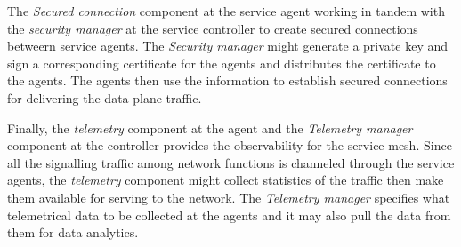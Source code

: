\documentclass[a4paper]{article}
\begin{document}
The \textit{Secured connection} component at the service agent working in tandem with the \textit{security manager} at the service controller to create secured connections betweern service agents. The \textit{Security manager} might generate a private key and sign a corresponding certificate for the agents and distributes the certificate to the agents. The agents then use the information to establish secured connections for delivering the data plane traffic.

Finally, the \textit{telemetry} component at the agent and the \textit{Telemetry manager} component at the controller provides the observability for the service mesh. Since all the signalling traffic among network functions is channeled through the service agents, the \textit{telemetry} component might collect statistics of the traffic then make them available for serving to the network. The \textit{Telemetry manager} specifies what telemetrical data to be collected at the agents and it may also pull the data from them for data analytics.

\end{document}
